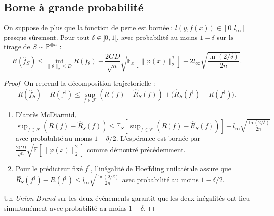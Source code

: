 \subsection{Borne à grande probabilité}

\begin{theorem}
    On suppose de plus que la fonction de perte est bornée : $l(y, f(x)) \in [0, l_\infty]$ presque sûrement. Pour tout $\delta \in ]0, 1[$, avec probabilité au moins $1 - \delta$ sur le tirage de $S \sim \mathbb{P}^{\otimes n}$ :
    \begin{equation}
        R(\hat{f}_S) \leqslant \inf_{\|\theta\|_2 \leqslant D} R(f_\theta) + \frac{2GD}{\sqrt{n}} \sqrt{\mathbb{E}_x \left[ \|\varphi(x)\|_2^2 \right]} + 2 l_\infty \sqrt{\frac{\ln(2/\delta)}{2n}}.
    \end{equation}
\end{theorem}

\begin{proof}
    On reprend la décomposition trajectorielle :
    \begin{equation*}
        R(\hat{f}_S) - R(f^\dagger) \leqslant \sup_{f \in \mathcal{F}} (R(f) - \hat{R}_S(f)) + \big( \hat{R}_S(f^\dagger) - R(f^\dagger) \big).
    \end{equation*}
    \begin{enumerate}
        \item D'après McDiarmid, $\sup_{f \in \mathcal{F}} (R(f) - \hat{R}_S(f)) \leqslant \mathbb{E}_S\left[\sup_{f \in \mathcal{F}} (R(f) - \hat{R}_S(f))\right] + l_\infty \sqrt{\frac{\ln(2/\delta)}{2n}}$ avec probabilité au moins $1 - \delta/2$. L'espérance est bornée par $\frac{2GD}{\sqrt{n}}\sqrt{\mathbb{E}[\|\varphi(x)\|_2^2]}$ comme démontré précédemment.
        \item Pour le prédicteur fixé $f^\dagger$, l'inégalité de Hoeffding unilatérale assure que $\hat{R}_S(f^\dagger) - R(f^\dagger) \leqslant l_\infty \sqrt{\frac{\ln(2/\delta)}{2n}}$ avec probabilité au moins $1 - \delta/2$.
    \end{enumerate}
    Un \emph{Union Bound} sur les deux événements garantit que les deux inégalités ont lieu simultanément avec probabilité au moins $1 - \delta$.
\end{proof}

